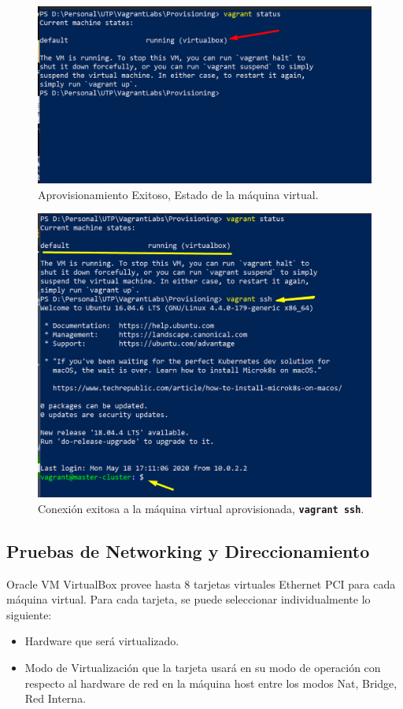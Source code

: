 \documentclass[letterpaper, 12pt, oneside]{article}
\begin{document}
    \begin{figure}[H]
        \includegraphics[scale=1]{img/provision/running.png}
        \caption{Aprovisionamiento Exitoso, Estado de la máquina virtual.}
        \label{fig:va6}
    \end{figure}
    \begin{center}
    \begin{figure}[H]
        \includegraphics[scale=1]{img/provision/running2.png}
        \caption{Conexión exitosa a la máquina virtual aprovisionada, \textbf{\texttt{vagrant ssh}}.}
        \label{fig:va6}
    \end{figure}
    \end{center}
    \subsection{Pruebas de Networking y Direccionamiento}
    Oracle VM VirtualBox provee hasta 8 tarjetas virtuales Ethernet PCI para cada máquina virtual. Para cada tarjeta, se puede seleccionar individualmente lo siguiente: 
    \begin{itemize}
        \item Hardware que será virtualizado.
        \item Modo de Virtualización que la tarjeta usará en su modo de operación con respecto al hardware de red en la máquina host entre los modos Nat, Bridge, Red Interna.
    \end{itemize}
    
\end{document}
